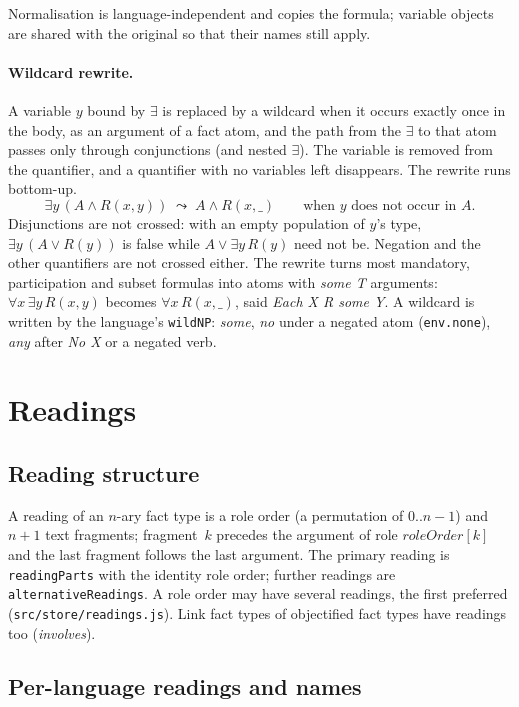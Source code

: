 \documentclass[11pt, a4paper]{article}
\newcommand{\code}[1]{\texttt{\color{codefg}#1}}
\begin{document}
Normalisation is language-independent and copies the formula; variable
objects are shared with the original so that their names still apply.

\paragraph{Wildcard rewrite.}
A variable $y$ bound by $\exists$ is replaced by a wildcard when it occurs
exactly once in the body, as an argument of a fact atom, and the path from
the $\exists$ to that atom passes only through conjunctions (and nested
$\exists$). The variable is removed from the quantifier, and a quantifier
with no variables left disappears. The rewrite runs bottom-up.
\[
\exists y\,(A \wedge R(x,y)) \;\leadsto\; A \wedge R(x,\_)
\qquad\text{when } y \text{ does not occur in } A.
\]
Disjunctions are not crossed: with an empty population of $y$'s type,
$\exists y\,(A \vee R(y))$ is false while $A \vee \exists y\,R(y)$ need not
be. Negation and the other quantifiers are not crossed either. The rewrite
turns most mandatory, participation and subset formulas into atoms with
\textit{some T} arguments: $\forall x\,\exists y\,R(x,y)$ becomes
$\forall x\,R(x,\_)$, said \textit{Each X R some Y}. A wildcard is written by
the language's \code{wildNP}: \textit{some}, \textit{no} under a negated atom
(\code{env.none}), \textit{any} after \textit{No X} or a negated verb.

\section{Readings}
\label{sec:readings}

\subsection{Reading structure}

A reading of an $n$-ary fact type is a role order (a permutation of
$0..n-1$) and $n+1$ text fragments; fragment~$k$ precedes the argument of
role $\mathit{roleOrder}[k]$ and the last fragment follows the last argument.
The primary reading is \code{readingParts} with the identity role order;
further readings are \code{alternativeReadings}. A role order may have
several readings, the first preferred (\code{src/store/readings.js}). Link
fact types of objectified fact types have readings too (\textit{involves}).

\subsection{Per-language readings and names}
\label{sec:lexicon}
\end{document}
